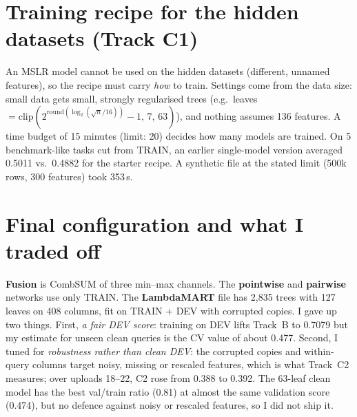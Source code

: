 \documentclass[10pt,a4paper]{article}
\begin{document}
\section{Training recipe for the hidden datasets (Track C1)}
\begin{center}
\end{center}
An MSLR model cannot be used on the hidden datasets (different, unnamed features), so the recipe must carry \emph{how} to train. Settings come from the data size: small data gets small, strongly regularised trees (e.g.\ leaves $=\mathrm{clip}(2^{\mathrm{round}(\log_2(\sqrt n/16))}-1,\,7,\,63)$), and nothing assumes 136 features. A time budget of 15 minutes (limit: 20) decides how many models are trained. On 5 benchmark-like tasks cut from TRAIN, an earlier single-model version averaged 0.5011 vs.\ 0.4882 for the starter recipe. A synthetic file at the stated limit (500k rows, 300 features) took 353\,s.

\section{Final configuration and what I traded off}
\textbf{Fusion} is CombSUM of three min--max channels. The \textbf{pointwise} and \textbf{pairwise} networks use only TRAIN. The \textbf{LambdaMART} file has 2{,}835 trees with 127 leaves on 408 columns, fit on TRAIN + DEV with corrupted copies. I gave up two things. First, \emph{a fair DEV score}: training on DEV lifts Track~B to 0.7079 but my estimate for unseen clean queries is the CV value of about 0.477. Second, I tuned for \emph{robustness rather than clean DEV}: the corrupted copies and within-query columns target noisy, missing or rescaled features, which is what Track~C2 measures; over uploads 18--22, C2 rose from 0.388 to 0.392. The 63-leaf clean model has the best val/train ratio (0.81) at almost the same validation score (0.474), but no defence against noisy or rescaled features, so I did not ship it.
\end{document}
